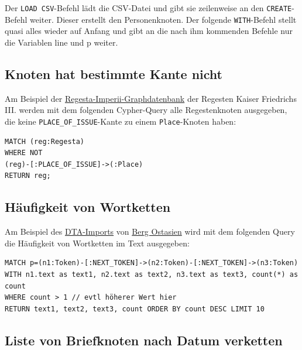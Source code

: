 Der \texttt{LOAD\ CSV}-Befehl lädt die CSV-Datei und gibt sie
zeilenweise an den \texttt{CREATE}-Befehl weiter. Dieser erstellt den
Personenknoten. Der folgende \texttt{WITH}-Befehl stellt quasi alles
wieder auf Anfang und gibt an die nach ihm kommenden Befehle nur die
Variablen line und p weiter.

\hypertarget{knoten-hat-bestimmte-kante-nicht}{%
\subsection{Knoten hat bestimmte Kante
nicht}\label{knoten-hat-bestimmte-kante-nicht}}

Am Beispiel der
\href{http://134.176.70.65:10210/browser/}{Regesta-Imperii-Graphdatenbank}
der Regesten Kaiser Friedrichs III. werden mit dem folgenden
Cypher-Query alle Regestenknoten ausgegeben, die keine
\texttt{PLACE\_OF\_ISSUE}-Kante zu einem \texttt{Place}-Knoten haben:

\begin{verbatim}
MATCH (reg:Regesta)
WHERE NOT
(reg)-[:PLACE_OF_ISSUE]->(:Place)
RETURN reg;
\end{verbatim}

\hypertarget{huxe4ufigkeit-von-wortketten}{%
\subsection{Häufigkeit von
Wortketten}\label{huxe4ufigkeit-von-wortketten}}

Am Beispiel des \href{http://134.176.70.65:10220/browser/}{DTA-Imports}
von
\href{http://www.deutschestextarchiv.de/book/show/berg_ostasien01_1864}{Berg
Ostasien} wird mit dem folgenden Query die Häufigkeit von Wortketten im
Text ausgegeben:

\begin{verbatim}
MATCH p=(n1:Token)-[:NEXT_TOKEN]->(n2:Token)-[:NEXT_TOKEN]->(n3:Token)
WITH n1.text as text1, n2.text as text2, n3.text as text3, count(*) as count
WHERE count > 1 // evtl höherer Wert hier
RETURN text1, text2, text3, count ORDER BY count DESC LIMIT 10
\end{verbatim}

\hypertarget{liste-von-briefknoten-nach-datum-verketten}{%
\subsection{Liste von Briefknoten nach Datum
verketten}\label{liste-von-briefknoten-nach-datum-verketten}}

